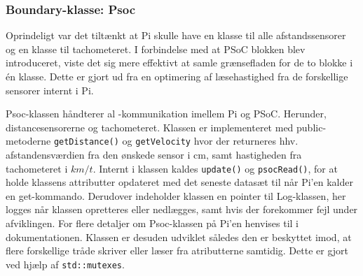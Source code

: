 \clearpage

\subsubsection{Boundary-klasse: Psoc} \label{sec:psoc_klasse}

Oprindeligt var det tiltænkt at Pi skulle have en klasse til alle afstandssensorer og en klasse til tachometeret.
I forbindelse med at PSoC blokken blev introduceret, viste det sig mere effektivt at samle grænsefladen for de to blokke i én klasse.
Dette er gjort ud fra en optimering af læsehastighed fra de forskellige sensorer internt i Pi.

Psoc-klassen håndterer al \IIC-kommunikation imellem Pi og PSoC. Herunder, distancesensorerne og tachometeret. 
Klassen er implementeret med public-metoderne \texttt{getDistance()} og \texttt{getVelocity} hvor der returneres hhv. afstandensværdien fra den ønskede sensor i cm, samt hastigheden fra tachometeret i $km/t$. 
Internt i klassen kaldes \texttt{update()} og \texttt{psocRead()}, for at holde klassens attributter opdateret med det seneste datasæt til når Pi'en kalder en get-kommando. 
Derudover indeholder klassen en pointer til Log-klassen, her logges når klassen opretteres eller nedlægges, samt hvis der forekommer fejl under afviklingen. For flere detaljer om Psoc-klassen på Pi'en henvises til  i dokumentationen.
Klassen er desuden udviklet således den er beskyttet imod, at flere forskellige tråde skriver eller læser fra atributterne samtidig. Dette er gjort ved hjælp af \texttt{std::mutexes}.
